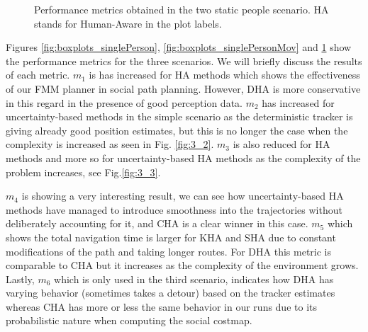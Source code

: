 \begin{figure}[t!]
%
%

\caption{Performance metrics obtained in the two static people scenario. HA stands for Human-Aware in the plot labels.}
\label{fig:boxplots_2people}
\end{figure}


Figures \ref{fig:boxplots_singlePerson}, \ref{fig:boxplots_singlePersonMov} and \ref{fig:boxplots_2people} show the performance metrics for the three scenarios. We will briefly discuss the results of each metric. $m_{1}$ is has increased for HA methods which shows the effectiveness of our FMM planner in social path planning. However, DHA is more conservative in this regard in the presence of good perception data. $m_{2}$ has increased for uncertainty-based methods in the simple scenario as the deterministic tracker is giving already good position estimates, but this is no longer the case when the complexity is increased as seen in Fig. \ref{fig:3_2}. $m_{3}$ is also reduced for HA methods and more so for uncertainty-based HA methods as the complexity of the problem increases, see Fig.\ref {fig:3_3}.


 $m_{4}$ is showing a very interesting result, we can see how uncertainty-based HA methods have managed to introduce smoothness into the trajectories without deliberately accounting for it, and CHA is a clear winner in this case. $m_{5}$ which shows the total navigation time is larger for KHA and SHA due to constant modifications of the path and taking longer routes. For DHA this metric is comparable to CHA but it increases as the complexity of the environment grows. Lastly, $m_{6}$ which is only used in the third scenario, indicates how DHA has varying behavior (sometimes takes a detour) based on the tracker estimates whereas CHA has more or less the same behavior in our runs due to its probabilistic nature when computing the social costmap.     



